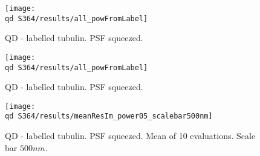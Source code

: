 \begin{figure}[!htb]
	\newcommand{\wf}{.9\textwidth}
	\centering
	\texttt{[image: \\qd S364/results/all\_powFromLabel]}
	\caption{QD - labelled tubulin. PSF squeezed.}
\end{figure}

\begin{figure}[!htb]
	\newcommand{\wf}{.9\textwidth}
	\centering
	\texttt{[image: \\qd S364/results/all\_powFromLabel]}
	\caption{QD - labelled tubulin. PSF squeezed.}
\end{figure}

\begin{figure}[!htb]
	\newcommand{\wf}{.9\textwidth}
	\centering
	\texttt{[image: \\qd S364/results/meanResIm\_power05\_scalebar500nm]}
	\caption{QD - labelled tubulin. PSF squeezed. Mean of 10 evaluations. Scale bar $500 \unit{nm}$.}
\end{figure}



